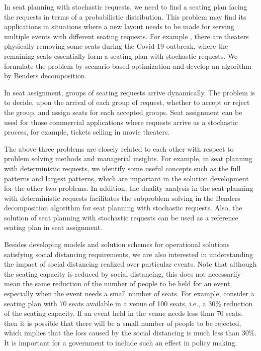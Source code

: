 In seat planning with stochastic requests, we need to find a seating plan facing the requests in terms of a probabilistic distribution. This problem may find its applications in situations where a new layout needs to be made for serving multiple events with different seating requests. For example  \cite{Berlin_theater}, there are theaters physically removing some seats during the Covid-19 outbreak, where the remaining seats essentially form a seating plan with stochastic requests. We formulate the problem by scenario-based optimization and develop an algorithm by Benders decomposition.

In seat assignment, groups of seating requests arrive dynamically. The problem is to decide, upon the arrival of each group of request, whether to accept or reject the group, and assign seats for each accepted groups. Seat assignment can be used for those commercial applications where requests arrive as a stochastic process, for example, tickets selling in movie theaters.

The above three problems are closely related to each other with respect to problem solving methods and managerial insights. For example, in seat planning with deterministic requests, we identify some useful concepts such as the full patterns and largest patterns, which are important in the solution development for the other two problems. In addition, the duality analysis in the seat planning with deterministic requests facilitates the subproblem solving in the Benders decomposition algorithm for seat planning with stochastic requests. Also, the solution of seat planning with stochastic requests can be used  as a reference seating plan in seat assignment.


Besides developing models and solution schemes for operational solutions satisfying  social distancing requirements, we are also interested in understanding the impact of social  distancing realized over  particular events. Note that although the seating capacity  is reduced by social distancing, this does not necessarily mean the same reduction of the number of people to be held for an event, especially when the event  needs a small number of seats. For example, consider a seating plan with 70 seats available in a venue of 100 seats, i.e., a 30\% reduction of the seating capacity. If an event held in the venue needs less than 70 seats, then it is possible that there will be a small number of people to be rejected, which implies that the loss caused by the social distancing is much less than 30\%. It is important for a government to include such an effect in policy making.

